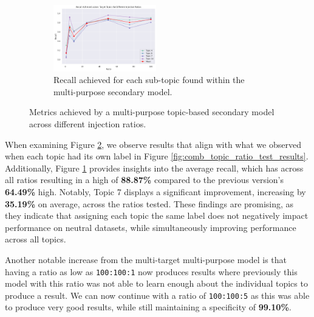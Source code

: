 \begin{figure}[ht]
    \begin{subfigure}[b]{\textwidth}
        \centering
        \includegraphics[width=0.49\textwidth]{graphs/ratio/combined_sl/sp.png}
        \caption{Recall achieved for each sub-topic found within the multi-purpose secondary model.}
        \label{subfig:secondary_positive_metrics_comb_sl}
    \end{subfigure}

    \vspace{0.2cm}

    \caption{Metrics achieved by a multi-purpose topic-based secondary model across different injection ratios.}
    \label{fig:comb_sl_topic_ratio_test_results}
\end{figure}

When examining Figure \ref{fig:comb_sl_topic_ratio_test_results}, we observe results that align with what we observed when each topic had its own label in Figure \ref{fig:comb_topic_ratio_test_results}. Additionally, Figure \ref{subfig:secondary_positive_metrics_comb_sl} provides insights into the average recall, which has across all ratios resulting in a high of \textbf{88.87\%} compared to the previous version's \textbf{64.49\%} high. Notably, Topic 7 displays a significant improvement, increasing by \textbf{35.19\%} on average, across the ratios tested. These findings are promising, as they indicate that assigning each topic the same label does not negatively impact performance on neutral datasets, while simultaneously improving performance across all topics.

Another notable increase from the multi-target multi-purpose model is that having a ratio as low as \verb|100:100:1| now produces results where previously this model with this ratio was not able to learn enough about the individual topics to produce a result. We can now continue with a ratio of \verb|100:100:5| as this was able to produce very good results, while still maintaining a specificity of \textbf{99.10\%}.

